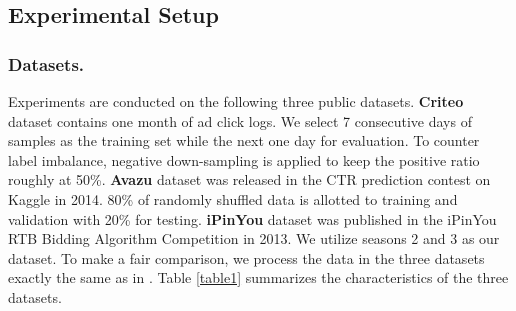 \documentclass[letterpaper]{article} \usepackage{aaai21}  \usepackage{times}  \usepackage{helvet} \usepackage{courier}  \usepackage[hyphens]{url}  \usepackage{graphicx} \urlstyle{rm} \def\UrlFont{\rm}  \usepackage{natbib}  \usepackage{caption} \frenchspacing  \setlength{\pdfpagewidth}{8.5in}  \setlength{\pdfpageheight}{11in}  \usepackage{graphicx}
\begin{document}
\begin{table}[h]
	\vspace{-0.2cm}
	\centering
	\fontsize{8pt}{11pt} 
	\caption{Statistics of Experimental Datasets.}
	\label{table1}
	\vspace{-0.3cm}
\end{table}


\vspace{-0.3cm}
\subsection{Experimental Setup}

\subsubsection{Datasets.} Experiments are conducted on the following three public datasets. \textbf{Criteo} dataset contains one month of ad click logs. We select 7 consecutive days of samples as the training set while the next one day for evaluation. To counter label imbalance, negative down-sampling is applied to keep the positive ratio roughly at 50\%. \textbf{Avazu} dataset was released in the CTR prediction contest on Kaggle in 2014. 80\% of randomly shuffled data is allotted to training and validation with 20\% for testing. \textbf{iPinYou} dataset was published in the iPinYou RTB Bidding Algorithm Competition in 2013. We utilize seasons 2 and 3 as our dataset. To make a fair comparison, we process the data in the three datasets exactly the same as in . Table \ref{table1} summarizes the characteristics of the three datasets.
\end{document}
